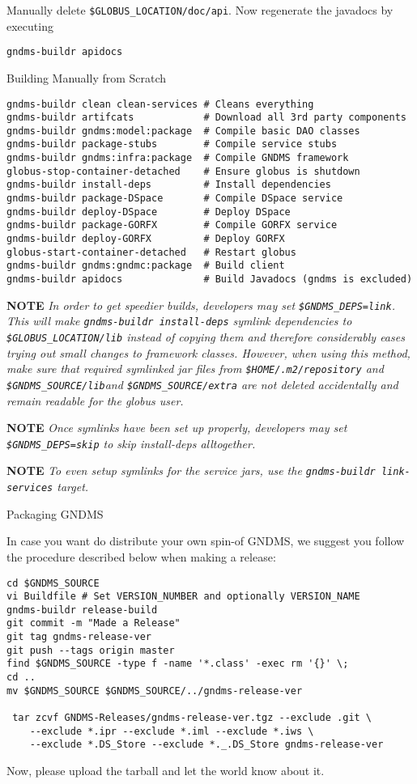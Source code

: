 \documentclass{article}
\begin{document}
Manually delete \verb!$GLOBUS_LOCATION/doc/api!. Now regenerate the
javadocs by executing

\begin{verbatim}
gndms-buildr apidocs
\end{verbatim}
Building Manually from Scratch

\begin{verbatim}
gndms-buildr clean clean-services # Cleans everything
gndms-buildr artifcats            # Download all 3rd party components
gndms-buildr gndms:model:package  # Compile basic DAO classes
gndms-buildr package-stubs        # Compile service stubs
gndms-buildr gndms:infra:package  # Compile GNDMS framework
globus-stop-container-detached    # Ensure globus is shutdown
gndms-buildr install-deps         # Install dependencies
gndms-buildr package-DSpace       # Compile DSpace service
gndms-buildr deploy-DSpace        # Deploy DSpace
gndms-buildr package-GORFX        # Compile GORFX service
gndms-buildr deploy-GORFX         # Deploy GORFX
globus-start-container-detached   # Restart globus
gndms-buildr gndms:gndmc:package  # Build client
gndms-buildr apidocs              # Build Javadocs (gndms is excluded)
\end{verbatim}

\textbf{NOTE}
\emph{In order to get speedier builds, developers may set \texttt{\$GNDMS\_DEPS=link}. This will make \texttt{gndms-buildr install-deps} symlink dependencies to \texttt{\$GLOBUS\_LOCATION/lib} instead of copying them and therefore considerably eases trying out small changes to framework classes. However, when using this method, make sure that required symlinked jar files from \texttt{\$HOME/.m2/repository} and \texttt{\$GNDMS\_SOURCE/lib}and \texttt{\$GNDMS\_SOURCE/extra} are not deleted accidentally and remain readable for the globus user.}

\textbf{NOTE}
\emph{Once symlinks have been set up properly, developers may set \texttt{\$GNDMS\_DEPS=skip} to skip install-deps alltogether.}

\textbf{NOTE}
\emph{To even setup symlinks for the service jars, use the \texttt{gndms-buildr link-services} target.}

Packaging GNDMS

In case you want do distribute your own spin-of GNDMS, we suggest
you follow the procedure described below when making a release:

\begin{verbatim}
cd $GNDMS_SOURCE
vi Buildfile # Set VERSION_NUMBER and optionally VERSION_NAME
gndms-buildr release-build
git commit -m "Made a Release"
git tag gndms-release-ver
git push --tags origin master
find $GNDMS_SOURCE -type f -name '*.class' -exec rm '{}' \;
cd ..
mv $GNDMS_SOURCE $GNDMS_SOURCE/../gndms-release-ver

 tar zcvf GNDMS-Releases/gndms-release-ver.tgz --exclude .git \
    --exclude *.ipr --exclude *.iml --exclude *.iws \
    --exclude *.DS_Store --exclude *._.DS_Store gndms-release-ver
\end{verbatim}
Now, please upload the tarball and let the world know about it.
\end{document}
